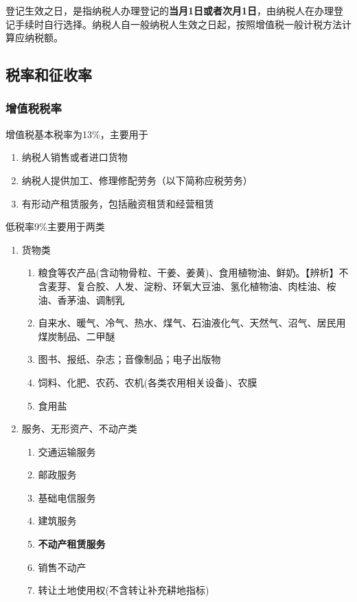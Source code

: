 \documentclass[UTF8,12pt]{ctexart}
\numberwithin{equation}{section} %
\numberwithin{figure}{section}
\numberwithin{table}{section}
\begin{document}
	登记生效之日，是指纳税人办理登记的\textbf{当月1日或者次月1日}，由纳税人在办理登记手续时自行选择。纳税人自一般纳税人生效之日起，按照增值税一般计税方法计算应纳税额。
	
	\subsection{税率和征收率}
	\subsubsection{增值税税率}
	增值税基本税率为13\%，主要用于
	\begin{enumerate}
		\item 纳税人销售或者进口货物
		
		\item 纳税人提供加工、修理修配劳务（以下简称应税劳务）
		
		\item 有形动产租赁服务，包括融资租赁和经营租赁
	\end{enumerate}
	
	低税率9\%主要用于两类
	\begin{enumerate}
		\item 货物类
		\begin{enumerate}
			\item 粮食等农产品(含动物骨粒、干姜、姜黄)、食用植物油、鲜奶。【辨析】不含麦芽、复合胶、人发、淀粉、环氧大豆油、氢化植物油、肉桂油、桉油、香茅油、调制乳
			
			\item 自来水、暖气、冷气、热水、煤气、石油液化气、天然气、沼气、居民用煤炭制品、二甲醚
			
			\item 图书、报纸、杂志；音像制品；电子出版物
			
			\item 饲料、化肥、农药、农机(各类农用相关设备)、农膜
			
			\item 食用盐
		\end{enumerate}
		
		\item 服务、无形资产、不动产类
		\begin{enumerate}
			\item 交通运输服务
			
			\item 邮政服务
			
			\item 基础电信服务
			
			\item 建筑服务
			
			\item \textbf{不动产租赁服务}
			
			\item 销售不动产
			
			\item 转让土地使用权(不含转让补充耕地指标)
		\end{enumerate}
	\end{enumerate}
	
\end{document}
